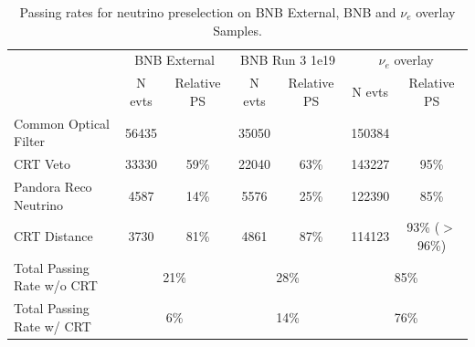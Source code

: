 \begin{table}[h]
\begin{tabular}{ c || c | c || c | c || c | c || }
\cline{2-7}
                                            & \multicolumn{2}{c||}{BNB External} & \multicolumn{2}{c||}{BNB Run 3 1e19} & \multicolumn{2}{c||}{$\nu_e$ overlay} \\ \cline{2-7} 
                                            & N evts        & Relative PS       & N evts         & Relative PS        & N evts       & Relative PS       \\ \hline
\multicolumn{1}{|l||}{Common Optical Filter}  & 56435         &                   & 35050          &                    & 150384       &                   \\ \hline
\multicolumn{1}{|l||}{CRT Veto}                       & 33330         & 59\%          & 22040          & 63\%               & 143227       & 95\%              \\ \hline
\multicolumn{1}{|l||}{Pandora Reco Neutrino} & 4587          & 14\%           & 5576           & 25\%              & 122390       & 85\%              \\ \hline
\multicolumn{1}{|l||}{CRT Distance}                & 3730          & 81\%            & 4861           & 87\%              & 114123       & 93\% ($>$96\%)              \\ \hline \hline 
\multicolumn{1}{|l||}{Total Passing Rate w/o CRT}    &         \multicolumn{2}{c||}{ 21\%}    &   \multicolumn{2}{c||}{28\%}  & \multicolumn{2}{c||}{85\%}\\ \hline
\multicolumn{1}{|l||}{Total Passing Rate w/ CRT}       &                 \multicolumn{2}{c||}{6\%}      & \multicolumn{2}{c||}{14\%}     &  \multicolumn{2}{c||}{76\% }   \\ \hline
\end{tabular}
\caption{Passing rates for neutrino preselection on BNB External, BNB and $\nu_e$ overlay Samples.}
\label{tab:PS}
\end{table}


